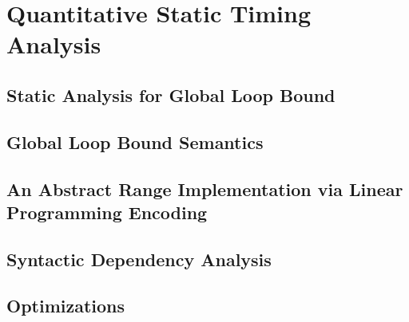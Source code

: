 \chapter{Quantitative Static Timing Analysis}

\section{Static Analysis for Global Loop Bound}

\section{Global Loop Bound Semantics}

\section{An Abstract Range Implementation via Linear Programming Encoding}

\section{Syntactic Dependency Analysis}

\section{Optimizations}
